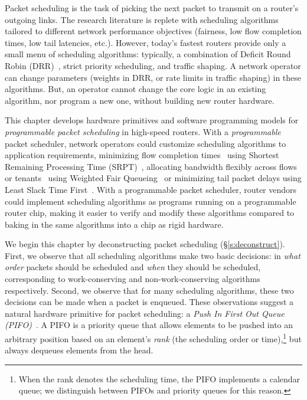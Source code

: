 Packet scheduling is the task of picking the next packet to transmit on a
router's outgoing links. The research literature is replete with scheduling
algorithms~\cite{wfq, srr, lstf, drr, pFabric} tailored to different network
performance objectives (\eg fairness, low flow completion times, low tail
latencies, etc.).  However, today's fastest routers provide only a small menu
of scheduling algorithms: typically, a combination of Deficit Round Robin
(DRR)~\cite{drr}, strict priority scheduling, and traffic shaping. A network
operator can change parameters (\eg weights in DRR, or rate limits in traffic
shaping) in these algorithms. But, an operator cannot change the core logic in
an existing algorithm, nor program a new one, without building new router
hardware.

 This chapter develops hardware primitives and software programming models for
{\em programmable packet scheduling} in high-speed routers. With a {\em
programmable} packet scheduler, network operators could customize scheduling
algorithms to application requirements, \eg minimizing flow completion
times~\cite{pFabric} using Shortest Remaining Processing Time (SRPT)~\cite{srpt},
allocating bandwidth flexibly across flows or tenants~\cite{eyeq, faircloud}
using Weighted Fair Queueing~\cite{wfq} or minimizing tail packet delays using
Least Slack Time First~\cite{lstf}.  With a programmable packet scheduler,
router vendors could implement scheduling algorithms as programs running on a
programmable router chip, making it easier to verify and modify these
algorithms compared to baking in the same algorithms into a chip as rigid
hardware.

We begin this chapter by deconstructing packet scheduling
(\S\ref{s:deconstruct}). First, we observe that all scheduling algorithms make
two basic decisions: in {\em what order} packets should be scheduled and {\em
when} they should be scheduled, corresponding to work-conserving and
non-work-conserving algorithms respectively.  Second, we observe that for many
scheduling algorithms, these two decisions can be made when a packet is
enqueued. These observations suggest a natural hardware primitive for packet
scheduling: a {\em Push In First Out Queue (PIFO)}~\cite{pifo}. A PIFO is a
priority queue that allows elements to be pushed into an arbitrary position
based on an element's {\em rank} (the scheduling order or time),\footnote{When
the rank denotes the scheduling time, the PIFO implements a calendar queue; we
distinguish between PIFOs and priority queues for this reason.} but always
dequeues elements from the head.


